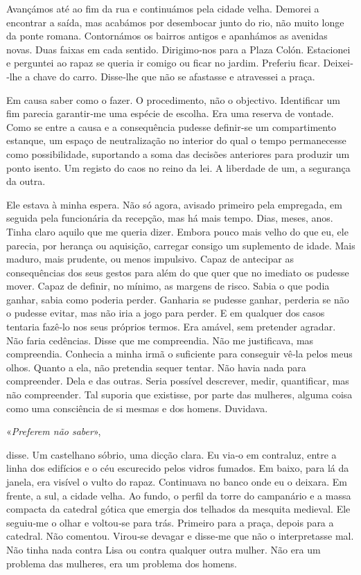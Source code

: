 Avançámos até ao fim da rua e continuámos pela cidade velha. Demorei a
encontrar a saída, mas acabámos por desembocar junto do rio, não muito
longe da ponte romana. Contornámos os bairros antigos e apanhámos as
avenidas novas. Duas faixas em cada sentido. Dirigimo­‑nos para a Plaza
Colón. Estacionei e perguntei ao rapaz se queria ir comigo ou ficar no
jardim. Preferiu ficar. Deixei­‑lhe a chave do carro. Disse­‑lhe que não
se afastasse e atravessei a praça.

Em causa saber como o fazer. O procedimento, não o objectivo.
Identificar um fim parecia garantir­‑me uma espécie de escolha. Era uma
reserva de vontade. Como se entre a causa e a consequência pudesse
definir­‑se um compartimento estanque, um espaço de neutralização no
interior do qual o tempo permanecesse como possibilidade, suportando a
soma das decisões anteriores para produzir um ponto isento. Um registo
do caos no reino da lei. A liberdade de um, a segurança da outra.

Ele estava à minha espera. Não só agora, avisado primeiro pela
empregada, em seguida pela funcionária da recepção, mas há mais tempo.
Dias, meses, anos. Tinha claro aquilo que me queria dizer. Embora pouco
mais velho do que eu, ele parecia, por herança ou aquisição, carregar
consigo um suplemento de idade. Mais maduro, mais prudente, ou menos
impulsivo. Capaz de antecipar as consequências dos seus gestos para além
do que quer que no imediato os pudesse mover. Capaz de definir, no
mínimo, as margens de risco. Sabia o que podia ganhar, sabia como
poderia perder. Ganharia se pudesse ganhar, perderia se não o pudesse
evitar, mas não iria a jogo para perder. E em qualquer dos casos
tentaria fazê­‑lo nos seus próprios termos. Era amável, sem pretender
agradar. Não faria cedências. Disse que me compreendia. Não me
justificava, mas compreendia. Conhecia a minha irmã o suficiente para
conseguir vê­‑la pelos meus olhos. Quanto a ela, não pretendia sequer
tentar. Não havia nada para compreender. Dela e das outras. Seria
possível descrever, medir, quantificar, mas não compreender. Tal suporia
que existisse, por parte das mulheres, alguma coisa como uma consciência
de si mesmas e dos homens. Duvidava.

«\emph{Preferem não saber}»,

disse. Um castelhano sóbrio, uma dicção clara. Eu via­‑o em contraluz,
entre a linha dos edifícios e o céu escurecido pelos vidros fumados. Em
baixo, para lá da janela, era visível o vulto do rapaz. Continuava no
banco onde eu o deixara. Em frente, a sul, a cidade velha. Ao fundo, o
perfil da torre do campanário e a massa compacta da catedral gótica que
emergia dos telhados da mesquita medieval. Ele seguiu­‑me o olhar e
voltou­‑se para trás. Primeiro para a praça, depois para a catedral. Não
comentou. Virou­‑se devagar e disse­‑me que não o interpretasse mal. Não
tinha nada contra Lisa ou contra qualquer outra mulher. Não era um
problema das mulheres, era um problema dos homens.

